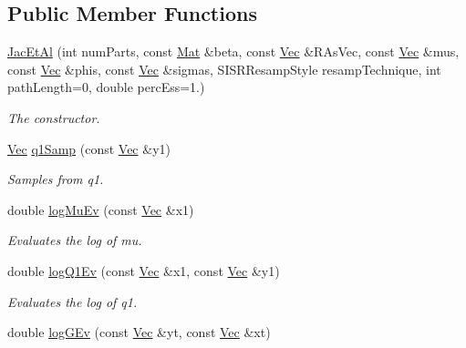 \subsection*{Public Member Functions}
\begin{DoxyCompactItemize}
\item 
\hyperlink{classJacEtAl_a356023f0edf2c58601e47f8cc0fe4ae0}{Jac\+Et\+Al} (int num\+Parts, const \hyperlink{pmfs_8h_ae601f56a556993079f730483c574356f}{Mat} \&beta, const \hyperlink{pmfs_8h_a4c7df05c6f5e8a0d15ae14bcdbc07152}{Vec} \&R\+As\+Vec, const \hyperlink{pmfs_8h_a4c7df05c6f5e8a0d15ae14bcdbc07152}{Vec} \&mus, const \hyperlink{pmfs_8h_a4c7df05c6f5e8a0d15ae14bcdbc07152}{Vec} \&phis, const \hyperlink{pmfs_8h_a4c7df05c6f5e8a0d15ae14bcdbc07152}{Vec} \&sigmas, S\+I\+S\+R\+Resamp\+Style resamp\+Technique, int path\+Length=0, double perc\+Ess=1.)
\begin{DoxyCompactList}\small\item\em The constructor. \end{DoxyCompactList}\item 
\hyperlink{pmfs_8h_a4c7df05c6f5e8a0d15ae14bcdbc07152}{Vec} \hyperlink{classJacEtAl_a154ca22da5c981f2d0c9515dc89a472c}{q1\+Samp} (const \hyperlink{pmfs_8h_a4c7df05c6f5e8a0d15ae14bcdbc07152}{Vec} \&y1)
\begin{DoxyCompactList}\small\item\em Samples from q1. \end{DoxyCompactList}\item 
double \hyperlink{classJacEtAl_a96f970a2b0e7f0583a5fe567b6353ffe}{log\+Mu\+Ev} (const \hyperlink{pmfs_8h_a4c7df05c6f5e8a0d15ae14bcdbc07152}{Vec} \&x1)
\begin{DoxyCompactList}\small\item\em Evaluates the log of mu. \end{DoxyCompactList}\item 
double \hyperlink{classJacEtAl_aec5fff50e30a9df174b04f2ab53c73d0}{log\+Q1\+Ev} (const \hyperlink{pmfs_8h_a4c7df05c6f5e8a0d15ae14bcdbc07152}{Vec} \&x1, const \hyperlink{pmfs_8h_a4c7df05c6f5e8a0d15ae14bcdbc07152}{Vec} \&y1)
\begin{DoxyCompactList}\small\item\em Evaluates the log of q1. \end{DoxyCompactList}\item 
double \hyperlink{classJacEtAl_aa37b7701fac288d76b72640b2c98f253}{log\+G\+Ev} (const \hyperlink{pmfs_8h_a4c7df05c6f5e8a0d15ae14bcdbc07152}{Vec} \&yt, const \hyperlink{pmfs_8h_a4c7df05c6f5e8a0d15ae14bcdbc07152}{Vec} \&xt)

\end{DoxyCompactItemize}
